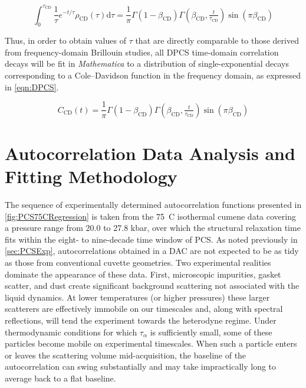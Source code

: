 \begin{equation}
	\int_{0}^{\tau_{\mathrm{CD}}} \frac{1}{\tau}e^{-t/\tau}\rho_{\mathrm{CD}}(\tau)\mathrm{d}\tau= \frac{1}{\pi}\Gamma\left(1-\beta_{\mathrm{CD}}\right)\Gamma\left(\beta_{\mathrm{CD}}, \tfrac{t}{\tau_{\mathrm{CD}}}\right)\sin\left(\pi\beta_{\mathrm{CD}}\right)
	\label{eqn:timeColeDavidson}
\end{equation}

Thus, in order to obtain values of $\tau$ that are directly comparable to those derived from frequency-domain Brillouin studies, all DPCS time-domain correlation decays will be fit in \textit{Mathematica} to a distribution of single-exponential decays corresponding to a Cole–Davidson function in the frequency domain, as expressed in \eqn \ref{eqn:DPCS}.

\begin{equation}
	C_{\mathrm{CD}}(t) =\frac{1}{\pi}\Gamma\left(1-\beta_{\mathrm{CD}}\right)\Gamma\left(\beta_{\mathrm{CD}}, \tfrac{t}{\tau_{\mathrm{CD}}}\right)\sin\left(\pi \beta_{\mathrm{CD}}\right)
	\label{eqn:DPCS}
	\end{equation}

\section{Autocorrelation Data Analysis and Fitting Methodology}
\label{sec:DAC75CExample}

The sequence of experimentally determined autocorrelation functions presented in \fig \ref{fig:PCS75CRegression} is taken from the 75~\textdegree C isothermal cumene data covering a pressure range from 20.0 to 27.8 kbar, over which the structural relaxation time fits within the eight- to nine-decade time window of PCS. As noted previously in \sect \ref{sec:PCSExp}, autocorrelations obtained in a DAC are not expected to be as tidy as those from conventional cuvette geometries. Two experimental realities dominate the appearance of these data. First, microscopic impurities, gasket scatter, and dust create significant background scattering not associated with the liquid dynamics. At lower temperatures (or higher pressures) these larger scatterers are effectively immobile on our timescales and, along with spectral reflections, will tend the experiment towards the heterodyne regime. Under thermodynamic conditions for which $\tau_\alpha$ is sufficiently small, some of these particles become mobile on experimental timescales. When such a particle enters or leaves the scattering volume mid-acquisition, the baseline of the autocorrelation can swing substantially and may take impractically long to average back to a flat baseline.

